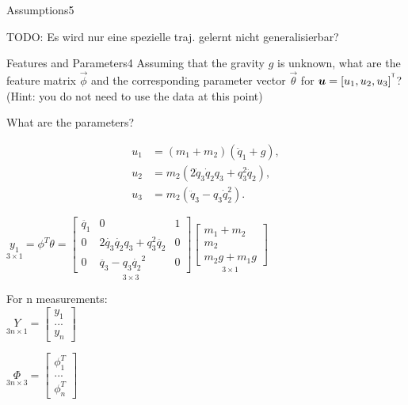 \begin{questions}
\begin{question}{Assumptions}{5}
\begin{answer}
	TODO:
	Es wird nur eine spezielle traj. gelernt nicht generalisierbar?


	\end{answer}

\end{question}



\begin{question}{Features and Parameters}{4}
Assuming that the gravity $g$ is unknown, what are the feature matrix $\vec{\phi}$ and the corresponding parameter vector $\vec{\theta}$ for ${\boldsymbol{u}}=[u_{1},u_{2},u_{3}]^{^\mathsf{T}}$?
(Hint: you do not need to use the data at this point)

\begin{answer}
	
	What are the parameters?
		
		\begin{align*}
		u_{1} &= (m_{1}+m_{2})(\ddot{q}_{1}+g),\\
		u_{2} &= m_{2}(2\dot{q}_{3}\dot{q}_{2}q_{3}+q_{3}^{2}\ddot{q}_{2}),\\
		u_{3} &= m_{2}(\ddot{q}_{3}-q_{3}\dot{q}_{2}^{2}).
		\end{align*}
		
	$\underset{3\times 1}{y_1}= \phi^T \theta=  \underset{3\times 3} {\begin{bmatrix}
	\ddot{q_1}&0&1\\0&2\dot{q_3}\dot{q_2}q_3+q_3^2\ddot{q_2}&0\\0&\ddot{q_3}-q_3 \dot{q_2}^2&0
	\end{bmatrix}}
	\underset{3\times 1}{\begin{bmatrix}
	m_1+m_2\\m_2\\ m_2g+m_1g
	\end{bmatrix}}$
	
	For n measurements: \\
	$\underset{3n \times 1}Y=\begin{bmatrix}
	y_1\\...\\y_n
	\end{bmatrix}$
	
	$\underset{3n \times 3}\Phi=\begin{bmatrix}
	\phi_1^T\\...\\ \phi_n^T
	\end{bmatrix}$
	

\end{answer}
\end{question}
\end{questions}

